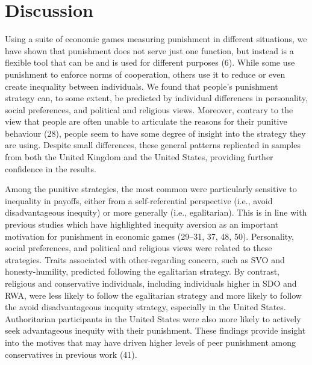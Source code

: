 \documentclass[
  english,
  man, donotrepeattitle,floatsintext]{apa6}
\begin{document}
\hypertarget{discussion}{%
\section{Discussion}\label{discussion}}

Using a suite of economic games measuring punishment in different situations,
we have shown that punishment does not serve just one function, but instead is
a flexible tool that can be and is used for different purposes (6).
While some use punishment to enforce norms of cooperation, others use it to
reduce or even create inequality between individuals. We found that people's
punishment strategy can, to some extent, be predicted by individual differences
in personality, social preferences, and political and religious views. Moreover,
contrary to the view that people are often unable to articulate the reasons for
their punitive behaviour (28), people seem to have some degree of
insight into the strategy they are using. Despite small differences, these
general patterns replicated in samples from both the United Kingdom and the
United States, providing further confidence in the results.

Among the punitive strategies, the most common were particularly sensitive to
inequality in payoffs, either from a self-referential perspective (i.e., avoid
disadvantageous inequity) or more generally (i.e., egalitarian). This is in
line with previous studies which have highlighted inequity aversion as an
important motivation for punishment in economic games
(29--31, 37, 48, 50).
Personality, social preferences, and political and religious views were related
to these strategies. Traits associated with other-regarding concern, such as SVO
and honesty-humility, predicted following the egalitarian strategy. By contrast,
religious and conservative individuals, including individuals higher in SDO and
RWA, were less likely to follow the egalitarian strategy and more likely to
follow the avoid disadvantageous inequity strategy, especially in the United
States. Authoritarian participants in the United States were also more likely to
actively seek advantageous inequity with their punishment. These findings
provide insight into the motives that may have driven higher levels of peer
punishment among conservatives in previous work (41).
\end{document}
